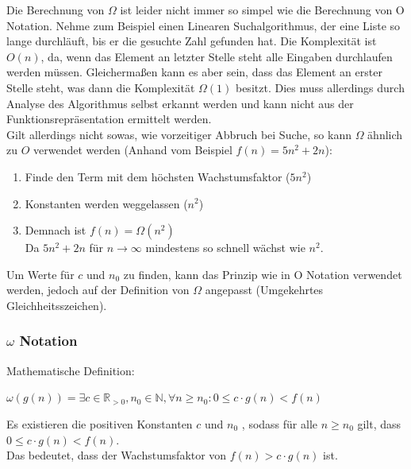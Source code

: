 \documentclass[
../../AuD-Zusammenfassung.tex,
]
{subfiles}
\begin{document}
Die Berechnung von $\Omega$ ist leider nicht immer so simpel wie die Berechnung von O Notation. Nehme zum Beispiel einen Linearen Suchalgorithmus, der eine Liste so lange durchläuft, bis er die gesuchte Zahl gefunden hat. Die Komplexität ist $O(n)$, da, wenn das Element an letzter Stelle steht alle Eingaben durchlaufen werden müssen. Gleichermaßen kann es aber sein, dass das Element an erster Stelle steht, was dann die Komplexität $\Omega(1)$ besitzt. Dies muss allerdings durch Analyse des Algorithmus selbst erkannt werden und kann nicht aus der Funktionsrepräsentation ermittelt werden.\\
Gilt allerdings nicht sowas, wie vorzeitiger Abbruch bei Suche, so kann $\Omega$ ähnlich zu $O$ verwendet werden (Anhand vom Beispiel $f(n) = 5n^2 + 2n$):
\begin{enumerate}
    \item Finde den Term mit dem höchsten Wachstumsfaktor ($5n^2$)
    \item Konstanten werden weggelassen ($n^2$)
    \item Demnach ist $f(n) = \Omega(n^2)$\\
    Da $5n^2 + 2n$ für $n \to \infty$ mindestens so schnell wächst wie $n^2$.
\end{enumerate}
Um Werte für $c$ und $n_0$ zu finden, kann das Prinzip wie in O Notation verwendet werden, jedoch auf der Definition von $\Omega$ angepasst (Umgekehrtes Gleichheitsszeichen).
\newpage
\subsubsection{$\omega$ Notation}
Mathematische Definition:
\begin{center}
    $\omega(g(n)) = \exists c \in \mathbb{R}_{>0}, n_0 \in \mathbb{N}, \forall n \geq n_0:  0 \leq c \cdot g(n) < f(n)$
\end{center}
Es existieren die positiven Konstanten $c$ und $n_0$ , sodass für alle $n \geq n_0$ gilt, dass  $0 \leq c \cdot g(n) < f(n)$. \\
Das bedeutet, dass der Wachstumsfaktor von $f(n) > c \cdot g(n)$ ist. \\
\end{document}
